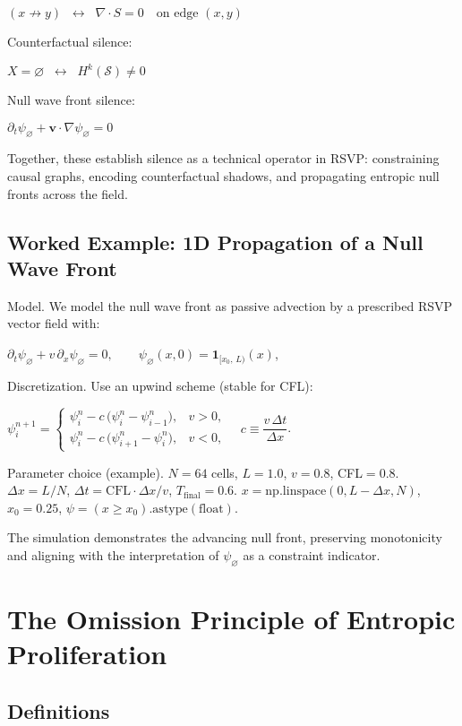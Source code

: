 \documentclass{article}
\begin{document}
$(x \not\to y) \;\; \leftrightarrow \;\; \nabla \cdot S = 0 \quad \text{on edge } (x,y)$

Counterfactual silence:

$X = \varnothing \;\; \leftrightarrow \;\; H^k(\mathcal{S}) \neq 0$

Null wave front silence:

$\partial_t \psi_{\varnothing} + \mathbf{v} \cdot \nabla \psi_{\varnothing} = 0$

Together, these establish silence as a technical operator in RSVP: constraining causal graphs, encoding counterfactual shadows, and propagating entropic null fronts across the field.

\subsection{Worked Example: 1D Propagation of a Null Wave Front}

Model. We model the null wave front as passive advection by a prescribed RSVP vector field with:

$\partial_t \psi_{\varnothing} + v\,\partial_x \psi_{\varnothing} = 0,\qquad
\psi_{\varnothing}(x,0) = \mathbf{1}_{[x_0,\,L)}(x)$,

Discretization. Use an upwind scheme (stable for CFL):

$\psi_i^{n+1} =
\begin{cases}
\psi_i^n - c\,\big(\psi_i^n - \psi_{i-1}^n\big), & v>0,\\[4pt]
\psi_i^n - c\,\big(\psi_{i+1}^n - \psi_i^n\big), & v<0,
\end{cases}
\quad
c \equiv \dfrac{v\,\Delta t}{\Delta x}$.

Parameter choice (example). $N=64$ cells, $L=1.0$, $v=0.8$, CFL$=0.8$. $\Delta x = L / N$, $\Delta t = \mathrm{CFL} \cdot \Delta x / v$, $T_\mathrm{final}=0.6$. $x = \mathrm{np.linspace}(0, L - \Delta x, N)$, $x_0=0.25$, $\psi = (x \geq x_0).\mathrm{astype(float)}$.

The simulation demonstrates the advancing null front, preserving monotonicity and aligning with the interpretation of $\psi_{\varnothing}$ as a constraint indicator.

\section{The Omission Principle of Entropic Proliferation} \label{app:C}

\subsection{Definitions}
\end{document}
